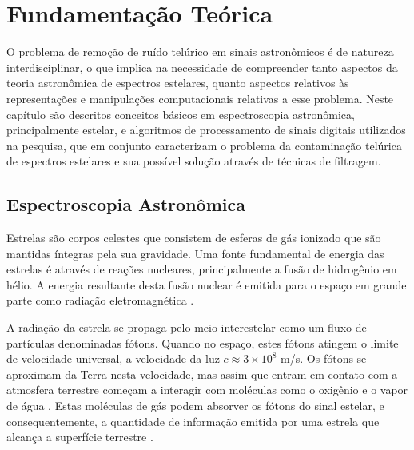 \chapter{Fundamentação Teórica}
\label{cap:fundamentacao-teorica}

O problema de remoção de ruído telúrico em sinais astronômicos é de natureza interdisciplinar, o que implica na necessidade de compreender tanto aspectos da teoria astronômica de espectros estelares, quanto aspectos relativos às representações e manipulações computacionais relativas a esse problema.
Neste capítulo são descritos conceitos básicos em espectroscopia astronômica, principalmente estelar, e algoritmos de processamento de sinais digitais utilizados na pesquisa, que em conjunto caracterizam o problema da contaminação telúrica de espectros estelares e sua possível solução através de técnicas de filtragem.

\section{Espectroscopia Astronômica} \label{astronomic-spectroscopy}

Estrelas são corpos celestes que consistem de esferas de gás ionizado que são mantidas íntegras pela sua gravidade. Uma fonte fundamental de energia das estrelas é através de reações nucleares, principalmente a fusão de hidrogênio em hélio. A energia resultante desta fusão nuclear é emitida para o espaço em grande parte como radiação eletromagnética \citep{estrelas-ufrgs}.   

A radiação da estrela se propaga pelo meio interestelar como um fluxo de partículas denominadas fótons. Quando no espaço, estes fótons atingem o limite de velocidade universal, a velocidade da luz $\textit{c} \approx 3 \times 10^8$ m/s. Os fótons se aproximam da Terra nesta velocidade, mas assim que entram em contato com a atmosfera terrestre começam a interagir com moléculas como o oxigênio e o vapor de água \citep{wiki:photon}. Estas moléculas de gás podem absorver os fótons do sinal estelar, e consequentemente,  a quantidade de informação emitida por uma estrela que alcança a superfície terrestre \citep{wiki:telluric-contamination}. 

